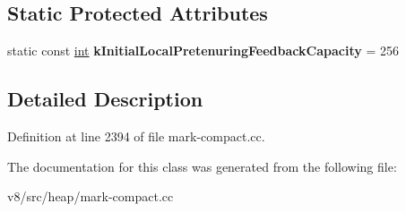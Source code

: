 \subsection*{Static Protected Attributes}
\begin{DoxyCompactItemize}
\item 
\mbox{\label{classv8_1_1internal_1_1Evacuator_a88def71cc944b7f7942965fcf86568c6}} 
static const \mbox{\hyperlink{classint}{int}} {\bfseries k\+Initial\+Local\+Pretenuring\+Feedback\+Capacity} = 256
\end{DoxyCompactItemize}


\subsection{Detailed Description}


Definition at line 2394 of file mark-\/compact.\+cc.



The documentation for this class was generated from the following file\+:\begin{DoxyCompactItemize}
\item 
v8/src/heap/mark-\/compact.\+cc\end{DoxyCompactItemize}
